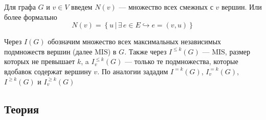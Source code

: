 \documentclass[12pt]{article}
\begin{document}
Для графа $G$ и $v \in V$ введем $N\left(v\right)$ --- множество всех смежных с $v$ вершин. Или более формально 
$$N\left(v\right) = \left\{u \, | \, \exists \, e \in E \hookrightarrow e = \left(v, u\right) \right\}$$

Через $I\left(G\right)$ обозначим множество всех максимальных независимых подмножеств вершин (далее $\text{MIS}$) в $G$. Также через $I^{\leq k}\left(G\right)$ --- $\text{MIS}$, размер которых не превышает $k$, a $I^{\leq k}_{v}\left(G\right)$ --- только те подмножества, которые вдобавок содержат вершину $v$. По аналогии зададим $I^{= k}\left(G\right)$, $I^{= k}_{v}\left(G\right)$, $I^{\geq k}\left(G\right)$ и $I^{\geq k}_{v}\left(G\right)$

\subsection{Теория}
\end{document}
